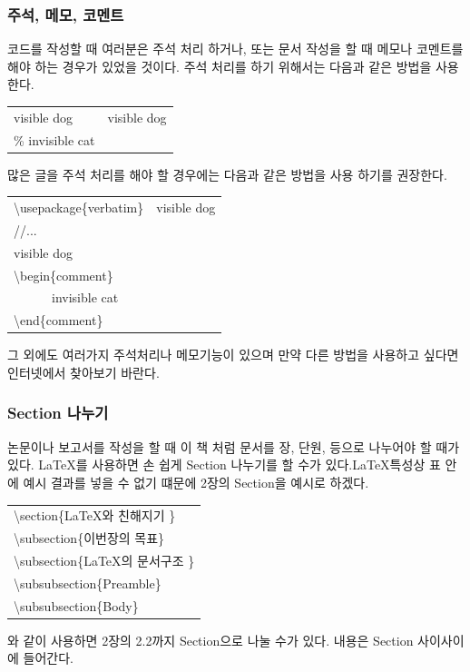 \documentclass[12pt]{article}
\begin{document}
	\subsubsection{주석, 메모, 코멘트}
	코드를 작성할 때 여러분은 주석 처리 하거나, 또는 문서 작성을 할 때 메모나 코멘트를 해야 하는 경우가 있었을 것이다.\newline
	주석 처리를 하기 위해서는 다음과 같은 방법을 사용한다.\newline
	
	\begin{tabularx}{\textwidth \onehalfspacing}{|X|X|}
		\hline
		visible dog & visible dog\\
		\% invisible cat & \\
		\hline
	\end{tabularx}
	\newline
	\newline
	많은 글을 주석 처리를 해야 할 경우에는 다음과 같은 방법을 사용 하기를 권장한다.\newline
	
	\begin{tabularx}{\textwidth \onehalfspacing}{|X|X|}
		\hline
		\textbackslash usepackage\{verbatim\} & visible dog\\
		//...& \\
		visible dog & \\
		\textbackslash begin\{comment\} & \\
		\ \ \ \ \ \ invisible cat & \\
		\textbackslash end\{comment\} & \\
		\hline
	\end{tabularx}
	\newline
	\newline
	그 외에도 여러가지 주석처리나 메모기능이 있으며 만약 다른 방법을 사용하고 싶다면 인터넷에서 찾아보기 바란다.
	\subsubsection{Section 나누기}
	논문이나 보고서를 작성을 할 때 이 책 처럼 문서를 장, 단원, 등으로 나누어야 할 때가 있다. \LaTeX 를 사용하면 손 쉽게 Section 나누기를 할 수가 있다.\LaTeX 특성상 표 안에 예시 결과를 넣을 수 없기 떄문에 2장의 Section을 예시로 하겠다.\newline
	
	\begin{tabularx}{\textwidth \onehalfspacing}{|X|}
		\hline
		\textbackslash section\{\LaTeX 와 친해지기 \}\\
		\textbackslash subsection\{이번장의 목표\}\\
		\textbackslash subsection\{\LaTeX 의 문서구조 \}\\
		\textbackslash subsubsection\{Preamble\}\\
		\textbackslash subsubsection\{Body\}\\
		\hline
	\end{tabularx}
	\newline
	\newline
	와 같이 사용하면 2장의 2.2까지 Section으로 나눌 수가 있다. 내용은 Section 사이사이에 들어간다.
	\clearpage
	
\end{document}
